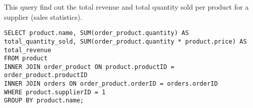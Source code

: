 This query find out the total revenue and total quantity sold per product for a supplier (sales statistics).

\begin{lstlisting}
SELECT product.name, SUM(order_product.quantity) AS total_quantity_sold, SUM(order_product.quantity * product.price) AS total_revenue
FROM product
INNER JOIN order_product ON product.productID = order_product.productID
INNER JOIN orders ON order_product.orderID = orders.orderID
WHERE product.supplierID = 1
GROUP BY product.name;
\end{lstlisting}